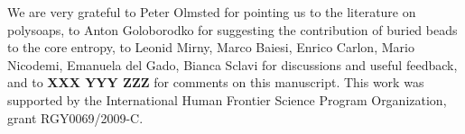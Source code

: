 \documentclass[
preprint,
a4paper,
12pt,
superscriptaddress,
pre]{revtex4}
\begin{document}





\begin{acknowledgments}
  We are very grateful to Peter Olmsted for pointing us to the
  literature on polysoaps, to Anton Goloborodko for suggesting the
  contribution of buried beads to the core entropy, to Leonid Mirny,
  Marco Baiesi, Enrico Carlon, Mario Nicodemi, Emanuela del Gado,
  Bianca Sclavi
  for discussions and useful feedback, and to \textbf{XXX YYY ZZZ}
  for comments on this manuscript.  This work was supported by the
  International Human Frontier Science Program Organization, grant
  RGY0069/2009-C.
\end{acknowledgments}



    


\appendix
\end{document}
